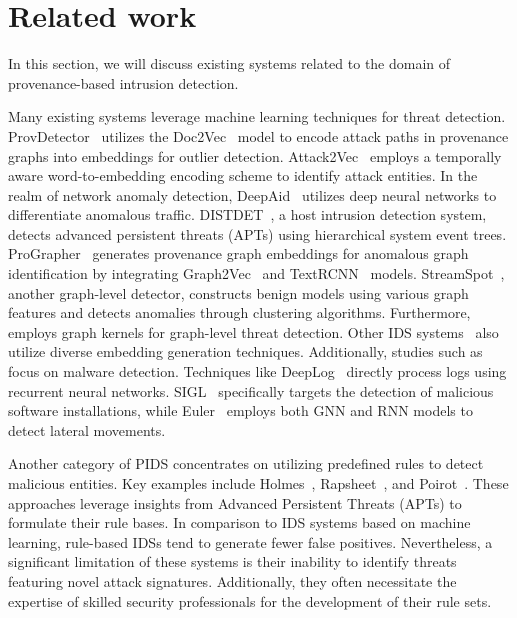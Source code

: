\section{Related work}
\label{s:relwk}

In this section, we will discuss existing systems related to the domain of provenance-based intrusion detection.


 Many existing systems leverage machine learning techniques for threat detection. ProvDetector~\cite{provdetector2020} utilizes the Doc2Vec~\cite{le2014distributed} model to encode attack paths in provenance graphs into embeddings for outlier detection. Attack2Vec~\cite{shen2019attack2vec} employs a temporally aware word-to-embedding encoding scheme to identify attack entities. In the realm of network anomaly detection, DeepAid~\cite{deepaid} utilizes deep neural networks to differentiate anomalous traffic. DISTDET~\cite{dong2023distdet}, a host intrusion detection system, detects advanced persistent threats (APTs) using hierarchical system event trees. ProGrapher~\cite{yangprographer} generates provenance graph embeddings for anomalous graph identification by integrating Graph2Vec~\cite{narayanan2017graph2vec} and TextRCNN~\cite{lai2015recurrent} models. StreamSpot~\cite{streamspot}, another graph-level detector, constructs benign models using various graph features and detects anomalies through clustering algorithms. Furthermore, \unicorn~\cite{han2020unicorn} employs graph kernels for graph-level threat detection. Other IDS systems~\cite{aljawarneh2018anomaly, maseer2021benchmarking, gyanchandani2012taxonomy,atlas} also utilize diverse embedding generation techniques. Additionally, studies such as \cite{zolkipli2011approach, chakkaravarthy2019survey, isohara2011kernel} focus on malware detection. Techniques like DeepLog~\cite{deeplog2017} directly process logs using recurrent neural networks. SIGL~\cite{sigl} specifically targets the detection of malicious software installations, while Euler~\cite{king2022euler} employs both GNN and RNN models to detect lateral movements.

 Another category of PIDS concentrates on utilizing predefined rules to detect malicious entities. Key examples include Holmes~\cite{holmes2019}, Rapsheet~\cite{rapsheet2020}, and Poirot~\cite{poirot2019}. These approaches leverage insights from Advanced Persistent Threats (APTs) to formulate their rule bases. In comparison to IDS systems based on machine learning, rule-based IDSs tend to generate fewer false positives. Nevertheless, a significant limitation of these systems is their inability to identify threats featuring novel attack signatures. Additionally, they often necessitate the expertise of skilled security professionals for the development of their rule sets.

